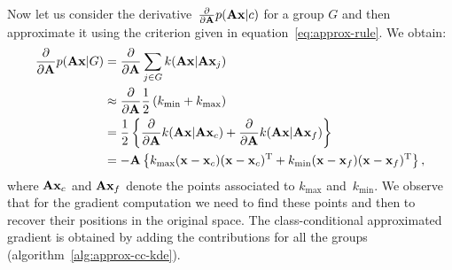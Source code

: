 Now let us consider the derivative~$\frac{\partial}{\partial \mathbf{A}}{p}(\mathbf{A}\mathbf{x}|c)$ for a group $G$ and  then approximate it using the criterion given in equation~\eqref{eq:approx-rule}. We obtain:
		\begin{align}
		  \frac{\partial}{\partial \mathbf{A}} p(\mathbf{A}\mathbf{x}|G)&=\frac{\partial}{\partial \mathbf{A}} \sum_{j\in G} k(\mathbf{A}\mathbf{x}|\mathbf{A}\mathbf{x}_j)\notag\\
			&\approx\frac{\partial}{\partial \mathbf{A}} \frac{1}{2} \left( k_{\min} + k_{\max} \right)\notag\\
			& = \frac{1}{2}\left\{ \frac{\partial}{\partial \mathbf{A}} k(\mathbf{A}\mathbf{x}|\mathbf{A}\mathbf{x}_c) +
\frac{\partial}{\partial \mathbf{A}} k(\mathbf{A}\mathbf{x}|\mathbf{A}\mathbf{x}_f) \right\}\notag\\
			& = -\mathbf{A}\left\{ k_{\max}(\mathbf{x}-\mathbf{x}_c)(\mathbf{x}-\mathbf{x}_c)^\textrm{T} +
			k_{\min}(\mathbf{x}-\mathbf{x}_f)(\mathbf{x}-\mathbf{x}_f)^\textrm{T} \right\},
		\label{eq:nca-kde-approx-pAXc}
	\end{align}
		where $\mathbf{A}\mathbf{x}_c$ and $\mathbf{A}\mathbf{x}_f$ denote the points associated to $k_{\max}$ and~$k_{\min}$. %
		We observe that for the gradient computation we need to find these points and then to recover their positions in the original space. The class-conditional approximated gradient is obtained by adding the contributions for all the groups (algorithm~\ref{alg:approx-cc-kde}).

